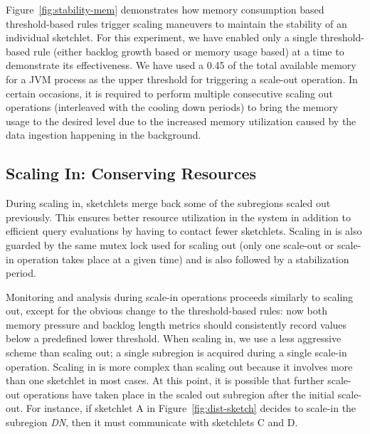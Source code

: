 %
Figure~\ref{fig:stability-mem} demonstrates how memory consumption based threshold-based rules trigger scaling maneuvers to maintain the stability of an individual sketchlet.
For this experiment, we have enabled only a single threshold-based rule (either backlog growth based or memory usage based) at a time to demonstrate its effectiveness.
We have used a 0.45 of the total available memory for a JVM process as the upper threshold for triggering a scale-out operation.
In certain occasions, it is required to perform multiple consecutive scaling out operations (interleaved with the cooling down periods) to bring the memory usage to the desired level due to the increased memory utilization caused by the data ingestion happening in the background.

%
\subsection{Scaling In: Conserving Resources}
\label{subsec:scaling-in}
During scaling in, sketchlets merge back some of the subregions scaled out previously.
This ensures better resource utilization in the system in addition to efficient query evaluations by having to contact fewer sketchlets.
Scaling in is also guarded by the same mutex lock used for scaling out (only one scale-out or scale-in operation takes place at a given time) and is also followed by a stabilization period.

Monitoring and analysis during scale-in operations proceeds similarly to scaling out, except for the obvious change to the threshold-based rules: now both memory pressure and backlog length metrics should consistently record values below a predefined lower threshold.
When scaling in, we use a less aggressive scheme than scaling out; a single subregion is acquired during a single scale-in operation.
Scaling in is more complex than scaling out because it involves more than one sketchlet in most cases.
At this point, it is possible that further scale-out operations have taken place in the scaled out subregion after the initial scale-out.
For instance, if sketchlet A in Figure~\ref{fig:dist-sketch} decides to scale-in the subregion \emph{DN}, then it must communicate with sketchlets C and D.

